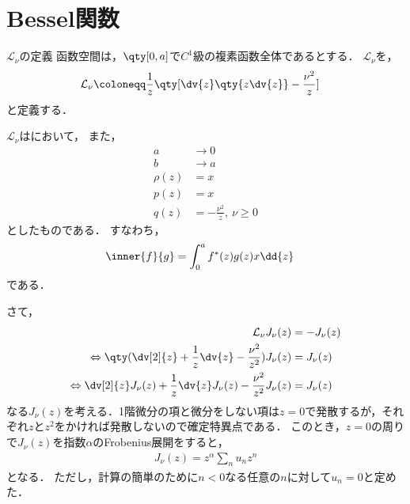 \documentclass{report}
\begin{document}
    \section{Bessel関数}
      \begin{mydef}{$\mathcal{L}_{\nu}$の定義}{}
        函数空間は，$\qty[0, a]$で$C^1$級の複素函数全体であるとする．
        $\mathcal{L}_{\nu}$を，
        \begin{align}
          \mathcal{L}_{\nu} &\coloneqq \frac{1}{z}\qty[\dv{z}\qty{z\dv{z}} - \frac{\nu^2}{z}]
        \end{align}
        と定義する．
      \end{mydef}
      \begin{myrem}{}{}
        $\mathcal{L}_{\nu}$はにおいて，
        また，
        \begin{align}
          a &\to 0 \\ 
          b &\to a \\
          \rho(z) &= x \\ 
          p(z) &= x \\ 
          q(z) &= -\frac{\nu^2}{z},\ \nu \geq 0
        \end{align}
        としたものである．
        すなわち，
        \begin{align}
          \inner{f}{g} &= \int_{0}^{a}f^*(z)g(z)x\dd{z}
        \end{align}
        である．
      \end{myrem}
      さて，
      \begin{align}
        \mathcal{L}_{\nu}J_{\nu}(z) &= - J_{\nu}(z)  \\ 
        \Leftrightarrow \qty(\dv[2]{z} + \frac{1}{z}\dv{z} - \frac{\nu^2}{z^2})J_{\nu}(z) &= J_{\nu}(z) \label{bessel-differential-eq-sub}\\ 
        \Leftrightarrow \dv[2]{z}J_{\nu}(z) + \frac{1}{z}\dv{z}J_{\nu}(z) - \frac{\nu^2}{z^2}J_{\nu}(z) &= J_{\nu}(z) \label{bessel-differential-eq}
      \end{align}
      なる$J_{\nu}(z)$を考える．1階微分の項と微分をしない項は$z = 0$で発散するが，それぞれ$z$と$z^2$をかければ発散しないので確定特異点である．
      このとき，$z = 0$の周りで$J_{\nu}(z)$を指数$\alpha$のFrobenius展開をすると，
      \begin{align}
        J_{\nu}(z) = z^{\alpha}\sum_{n}u_nz^n\label{bessel-func-frobenius}
      \end{align}
      となる．
      ただし，計算の簡単のために$n < 0$なる任意の$n$に対して$u_n = 0$と定めた．
\end{document}
